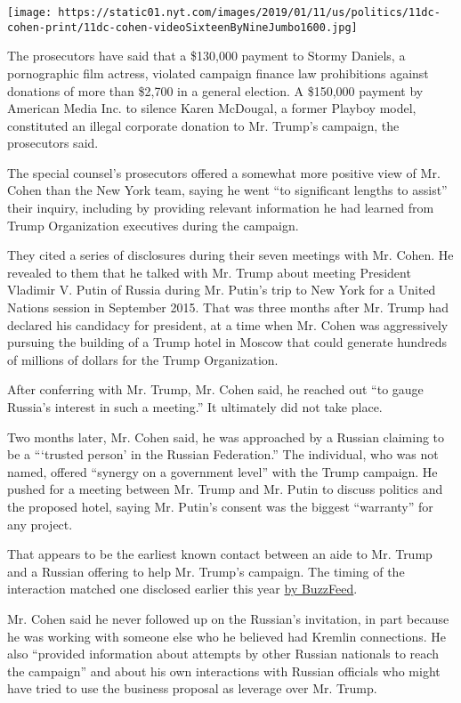 \texttt{[image: https://static01.nyt.com/images/2019/01/11/us/politics/11dc-cohen-print/11dc-cohen-videoSixteenByNineJumbo1600.jpg]}

The prosecutors have said that a \$130,000 payment to Stormy Daniels, a
pornographic film actress, violated campaign finance law prohibitions
against donations of more than \$2,700 in a general election. A
\$150,000 payment by American Media Inc. to silence Karen McDougal, a
former Playboy model, constituted an illegal corporate donation to Mr.
Trump's campaign, the prosecutors said.

The special counsel's prosecutors offered a somewhat more positive view
of Mr. Cohen than the New York team, saying he went ``to significant
lengths to assist'' their inquiry, including by providing relevant
information he had learned from Trump Organization executives during the
campaign.

They cited a series of disclosures during their seven meetings with Mr.
Cohen. He revealed to them that he talked with Mr. Trump about meeting
President Vladimir V. Putin of Russia during Mr. Putin's trip to New
York for a United Nations session in September 2015. That was three
months after Mr. Trump had declared his candidacy for president, at a
time when Mr. Cohen was aggressively pursuing the building of a Trump
hotel in Moscow that could generate hundreds of millions of dollars for
the Trump Organization.

After conferring with Mr. Trump, Mr. Cohen said, he reached out ``to
gauge Russia's interest in such a meeting.'' It ultimately did not take
place.

Two months later, Mr. Cohen said, he was approached by a Russian
claiming to be a ```trusted person' in the Russian Federation.'' The
individual, who was not named, offered ``synergy on a government level''
with the Trump campaign. He pushed for a meeting between Mr. Trump and
Mr. Putin to discuss politics and the proposed hotel, saying Mr. Putin's
consent was the biggest ``warranty'' for any project.

That appears to be the earliest known contact between an aide to Mr.
Trump and a Russian offering to help Mr. Trump's campaign. The timing of
the interaction matched one disclosed earlier this year
\href{https://www.buzzfeednews.com/article/anthonycormier/ivanka-trump-putin-moscow-meeting-michael-cohen-tower}{by
BuzzFeed}.

Mr. Cohen said he never followed up on the Russian's invitation, in part
because he was working with someone else who he believed had Kremlin
connections. He also ``provided information about attempts by other
Russian nationals to reach the campaign'' and about his own interactions
with Russian officials who might have tried to use the business proposal
as leverage over Mr. Trump.

